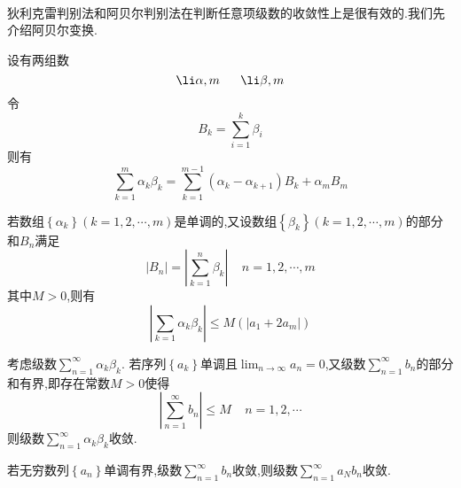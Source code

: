\documentclass{ctexart}
\begin{document}
\\
狄利克雷判别法和阿贝尔判别法在判断任意项级数的收敛性上是很有效的.我们先介绍阿贝尔变换.
\begin{formal}[3.1 阿贝尔变换]
    设有两组数
    \[\li\alpha,m\ \ \ \ \ \li\beta,m\]
    令
    \[B_k=\sum_{i=1}^{k}\beta_i\]
    则有
    \[\sum_{k=1}^{m}\alpha_k\beta_k=\sum_{k=1}^{m-1}\left(\alpha_k-\alpha_{k+1}\right)B_k+\alpha_mB_m\]
\end{formal}
\begin{formal}[3.2 阿贝尔引理]
    若数组$\left\{\alpha_k\right\}(k=1,2,\cdots,m)$是单调的,又设数组$\left\{\beta_k\right\}(k=1,2,\cdots,m)$的部分和$B_n$满足
    \[\left|B_n\right|=\left|\sum_{k=1}^n\beta_k\right|\ \ \ \ \ n=1,2,\cdots,m\]
    其中$M>0$,则有
    \[\left|\sum_{k=1}\alpha_k\beta_k\right|\leqslant M\left(\left|a_1+2a_m\right|\right)\]
\end{formal}
\begin{formal}[3.3 狄利克雷判别法]
    考虑级数$\displaystyle\sum_{n=1}^{\infty}\alpha_k\beta_k$.%
    若序列$\left\{a_k\right\}$单调且$\displaystyle\lim_{n\to\infty}a_n=0$,又级数$\displaystyle\sum_{n=1}^\infty b_n$的部分和有界,即存在常数$M>0$使得
    \[\left|\sum_{n=1}^\infty b_n\right|\leqslant M\ \ \ \ \ n=1,2,\cdots\]
    则级数$\displaystyle\sum_{n=1}^{\infty}\alpha_k\beta_k$收敛.
\end{formal}
\begin{formal}[3.4 阿贝尔判别法]
    若无穷数列$\left\{a_n\right\}$单调有界,级数$\displaystyle\sum_{n=1}^\infty b_n$收敛,则级数$\displaystyle\sum_{n=1}^\infty a_Nb_n$收敛.
\end{formal}
\end{document}
